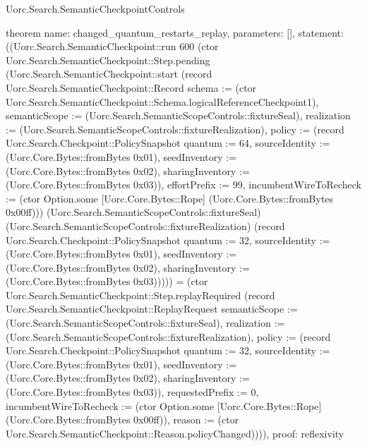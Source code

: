 \begin{lexlean}{Uorc.Search.SemanticCheckpointControls}
\begin{semanticmodule}
theorem{
  name: changed_quantum_restarts_replay,
  parameters: [],
  statement: ((Uorc.Search.SemanticCheckpoint::run 600 (ctor Uorc.Search.SemanticCheckpoint::Step.pending (Uorc.Search.SemanticCheckpoint::start (record Uorc.Search.SemanticCheckpoint::Record {schema := (ctor Uorc.Search.SemanticCheckpoint::Schema.logicalReferenceCheckpoint1), semanticScope := (Uorc.Search.SemanticScopeControls::fixtureSeal), realization := (Uorc.Search.SemanticScopeControls::fixtureRealization), policy := (record Uorc.Search.Checkpoint::PolicySnapshot {quantum := 64, sourceIdentity := (Uorc.Core.Bytes::fromBytes 0x01), seedInventory := (Uorc.Core.Bytes::fromBytes 0x02), sharingInventory := (Uorc.Core.Bytes::fromBytes 0x03)}), effortPrefix := 99, incumbentWireToRecheck := (ctor Option.some [Uorc.Core.Bytes::Rope] (Uorc.Core.Bytes::fromBytes 0x00ff))}) (Uorc.Search.SemanticScopeControls::fixtureSeal) (Uorc.Search.SemanticScopeControls::fixtureRealization) (record Uorc.Search.Checkpoint::PolicySnapshot {quantum := 32, sourceIdentity := (Uorc.Core.Bytes::fromBytes 0x01), seedInventory := (Uorc.Core.Bytes::fromBytes 0x02), sharingInventory := (Uorc.Core.Bytes::fromBytes 0x03)})))) = (ctor Uorc.Search.SemanticCheckpoint::Step.replayRequired (record Uorc.Search.SemanticCheckpoint::ReplayRequest {semanticScope := (Uorc.Search.SemanticScopeControls::fixtureSeal), realization := (Uorc.Search.SemanticScopeControls::fixtureRealization), policy := (record Uorc.Search.Checkpoint::PolicySnapshot {quantum := 32, sourceIdentity := (Uorc.Core.Bytes::fromBytes 0x01), seedInventory := (Uorc.Core.Bytes::fromBytes 0x02), sharingInventory := (Uorc.Core.Bytes::fromBytes 0x03)}), requestedPrefix := 0, incumbentWireToRecheck := (ctor Option.some [Uorc.Core.Bytes::Rope] (Uorc.Core.Bytes::fromBytes 0x00ff)), reason := (ctor Uorc.Search.SemanticCheckpoint::Reason.policyChanged)}))),
  proof: reflexivity{}
}


\end{semanticmodule}
\end{lexlean}
